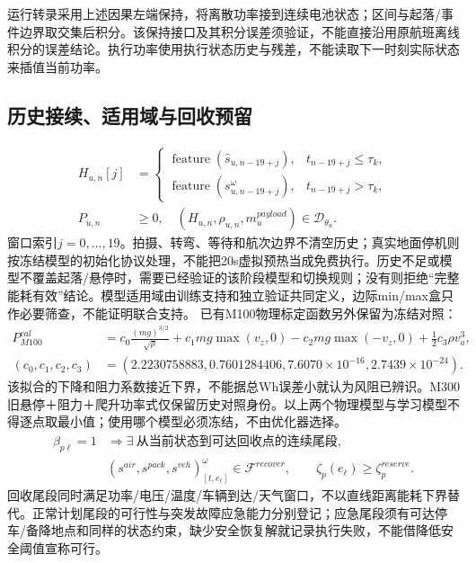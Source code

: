 \noindent 运行转录采用上述因果左端保持，将离散功率接到连续电池状态；区间与起落/事件边界取交集后积分。该保持接口及其积分误差须验证，不能直接沿用原航班离线积分的误差结论。执行功率使用执行状态历史与残差，不能读取下一时刻实际状态来插值当前功率。
\clearpage\subsection*{历史接续、适用域与回收预留}
\begin{align}
 H_{u,n}[j]&=\begin{cases}
  \operatorname{feature}(\widehat s_{u,n-19+j}),&t_{n-19+j}\le\tau_k,\\
  \operatorname{feature}(s^\omega_{u,n-19+j}),&t_{n-19+j}>\tau_k,
 \end{cases}\label{eng:eq:historyboundary}\\
 P_{u,n}&\ge0,\quad (H_{u,n},\rho_{u,n},m_u^{payload})\in\mathcal D_{\theta_u}.
 \label{eng:eq:powerdomain}
\end{align}
\noindent 窗口索引$j=0,\ldots,19$。拍摄、转弯、等待和航次边界不清空历史；真实地面停机则按冻结模型的初始化协议处理，不能把20s虚拟预热当成免费执行。历史不足或模型不覆盖起落/悬停时，需要已经验证的该阶段模型和切换规则；没有则拒绝“完整能耗有效”结论。模型适用域由训练支持和独立验证共同定义，边际min/max盒只作必要筛查，不能证明联合支持。
\noindent 已有M100物理标定函数另外保留为冻结对照：
\begin{align}
 P_{M100}^{cal}&=c_0\frac{(mg)^{3/2}}{\sqrt\rho}
       +c_1mg\max(v_z,0)-c_2mg\max(-v_z,0)
       +\tfrac12c_3\rho v_a^3,\label{eng:eq:m100calibration}\\
 (c_0,c_1,c_2,c_3)&=(2.2230758883,0.7601284406,
                    7.6070\!\times\!10^{-16},2.7439\!\times\!10^{-24}).
\end{align}
\noindent 该拟合的下降和阻力系数接近下界，不能据总Wh误差小就认为风阻已辨识。M300旧悬停＋阻力＋爬升功率式仅保留历史对照身份。以上两个物理模型与学习模型不得逐点取最小值；使用哪个模型必须冻结，不由优化器选择。
\begin{align}
 \beta_{p\ell}=1&\Rightarrow\exists\ \text{从当前状态到可达回收点的连续尾段},\\
 &(s^{air},s^{pack},s^{veh})^\omega_{[t,e_\ell]}
     \in\mathcal F^{recover},\qquad
 \zeta_p(e_\ell)\ge\zeta_p^{reserve}.
 \label{eng:eq:return}
\end{align}
\noindent 回收尾段同时满足功率/电压/温度/车辆到达/天气窗口，不以直线距离能耗下界替代。正常计划尾段的可行性与突发故障应急能力分别登记；应急尾段须有可达停车/备降地点和同样的状态约束，缺少安全恢复解就记录执行失败，不能借降低安全阈值宣称可行。
\clearpage

